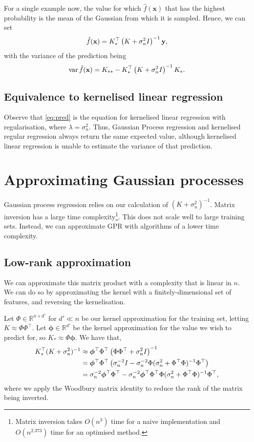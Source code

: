 \documentclass[11pt,twoside,openright]{report}
\newcommand\bphi{\bm{\phi}}
\newcommand\bbR{\mathbb{R}}
\newcommand\bx{\mathbf{x}}
\newcommand\by{\mathbf{y}}
\DeclareMathOperator{\var}{var}
\begin{document}
For a single example now, the value for which $\hat f(\bx)$ that has the highest probability is the mean of the Gaussian from which it is sampled. Hence, we can set \begin{equation}
    \label{eq:pred}
    \hat f(\bx) = K_*^\top\left(K + \sigma_n^2I\right)^{-1}\by\text,
\end{equation} with the variance of the prediction being\[
    \label{eq:gp-var}
    \var\hat f(\bx) = K_{**} - K_*^\top\left(K + \sigma_n^2I\right)^{-1}K_*\text.
\]

\subsection{Equivalence to kernelised linear regression}

Observe that \cref{eq:pred} is the equation for kernelised linear regression with regularisation, where $\lambda=\sigma_n^2$. Thus, Gaussian Process regression and kernelised regular regression always return the same expected value, although kernelised linear regression is unable to estimate the variance of that prediction.

\section{Approximating Gaussian processes}
\label{sec:approximating-gaussian-processes}

Gaussian process regression relies on our calculation of $(K+\sigma_n^2)^{-1}$. Matrix inversion has a large time complexity\footnote{Matrix inversion takes $O(n^3)$ time for a naive implementation and $O(n^{2.373})$ time for an optimised method.}. This does not scale well to large training sets. Instead, we can approximate GPR with algorithms of a lower time complexity.

\subsection{Low-rank approximation}

We can approximate this matrix product with a complexity that is linear in $n$. We can do so by approximating the kernel with a finitely-dimensional set of features, and reversing the kernelisation.

Let $\Phi \in \bbR^{n \times d'}$ for $d' \ll n$ be our kernel approximation for the training set, letting $K \approx \Phi \Phi^\top$. Let $\bphi \in \bbR^{d'}$ be the kernel approximation for the value we wish to predict for, so $K_* \approx \Phi \bphi$. We have that,\begin{align}
    K_*^\top(K+\sigma_n^2)^{-1} &\approx \bphi^\top\Phi^\top  \left(\Phi \Phi^\top + \sigma_n^2I\right)^{-1} \notag \\
    &= \bphi^\top\Phi^\top  \left( \sigma_n^{-2}I - \sigma_n^{-2}\Phi(\sigma_n^{2} + \Phi^\top\Phi)^{-1}\Phi^\top\right) \notag \\
    &=  \sigma_n^{-2}\bphi^\top\Phi^\top - \sigma_n^{-2}\bphi^\top\Phi^\top \Phi(\sigma_n^{2} + \Phi^\top\Phi)^{-1}\Phi^\top \text{,} \label{eq:gp-appx-woodbury}
\end{align} where we apply the Woodbury matrix identity\citep{Woodbury} to reduce the rank of the matrix being inverted.
\end{document}
